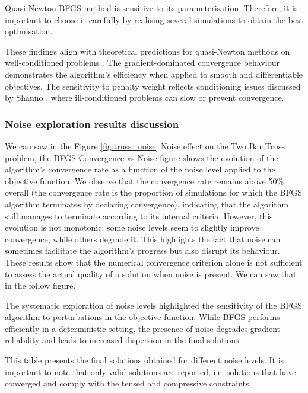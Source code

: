 Quasi-Newton BFGS method is sensitive to its parameterisation. Therefore, it is important to choose it carefully by realising several simulations to obtain the best optimisation.

These findings align with theoretical predictions for quasi-Newton methods on well-conditioned problems \cite[Chapter 8]{nocedalwright2006}. The gradient-dominated convergence behaviour demonstrates the algorithm’s efficiency when applied to smooth and differentiable objectives. The sensitivity to penalty weight reflects conditioning issues discussed by Shanno \cite{shanno1970}, where ill-conditioned problems can slow or prevent convergence.

\subsubsection{Noise exploration results discussion}
We can saw in the Figure \ref{fig:truss_noise} Noise effect on the Two Bar Truss problem, the BFGS Convergence vs Noise figure shows the evolution of the algorithm's convergence rate as a function of the noise level applied to the objective function. We observe that the convergence rate remains above 50\% overall (the convergence rate is the proportion of simulations for which the BFGS algorithm terminates by declaring convergence), indicating that the algorithm still manages to terminate according to its internal criteria. However, this evolution is not monotonic: some noise levels seem to slightly improve convergence, while others degrade it. This highlights the fact that noise can sometimes facilitate the algorithm's progress but also disrupt its behaviour. These results show that the numerical convergence criterion alone is not sufficient to assess the actual quality of a solution when noise is present. We can saw that in the follow figure.

The systematic exploration of noise levels highlighted the sensitivity of the BFGS algorithm to perturbations in the objective function. While BFGS performs efficiently in a deterministic setting, the presence of noise degrades gradient reliability and leads to increased dispersion in the final solutions.

This table presents the final solutions obtained for different noise levels. It is important to note that only valid solutions are reported, i.e. solutions that have converged and comply with the tensed and compressive constraints.

